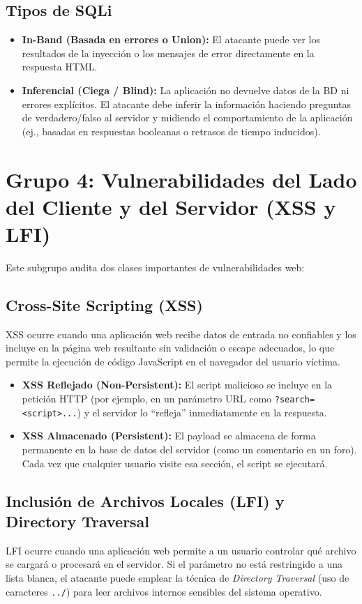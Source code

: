 \documentclass[12pt,letterpaper]{article}
\begin{document}
\subsection{Tipos de SQLi}
\begin{itemize}
    \item \textbf{In-Band (Basada en errores o Union):} El atacante puede ver los resultados de la inyección o los mensajes de error directamente en la respuesta HTML.
    \item \textbf{Inferencial (Ciega / Blind):} La aplicación no devuelve datos de la BD ni errores explícitos. El atacante debe inferir la información haciendo preguntas de verdadero/falso al servidor y midiendo el comportamiento de la aplicación (ej., basadas en respuestas booleanas o retrasos de tiempo inducidos).
\end{itemize}

\section{Grupo 4: Vulnerabilidades del Lado del Cliente y del Servidor (XSS y LFI)}
Este subgrupo audita dos clases importantes de vulnerabilidades web:

\subsection{Cross-Site Scripting (XSS)}
XSS ocurre cuando una aplicación web recibe datos de entrada no confiables y los incluye en la página web resultante sin validación o escape adecuados, lo que permite la ejecución de código JavaScript en el navegador del usuario víctima.

\begin{itemize}
    \item \textbf{XSS Reflejado (Non-Persistent):} El script malicioso se incluye en la petición HTTP (por ejemplo, en un parámetro URL como \texttt{?search=<script>...}) y el servidor lo ``refleja'' inmediatamente en la respuesta.
    \item \textbf{XSS Almacenado (Persistent):} El payload se almacena de forma permanente en la base de datos del servidor (como un comentario en un foro). Cada vez que cualquier usuario visite esa sección, el script se ejecutará.
\end{itemize}

\subsection{Inclusión de Archivos Locales (LFI) y Directory Traversal}
LFI ocurre cuando una aplicación web permite a un usuario controlar qué archivo se cargará o procesará en el servidor. Si el parámetro no está restringido a una lista blanca, el atacante puede emplear la técnica de \textit{Directory Traversal} (uso de caracteres \texttt{../}) para leer archivos internos sensibles del sistema operativo.
\end{document}
